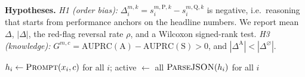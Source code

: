 \documentclass[9pt,twocolumn,letterpaper]{extarticle}
\begin{document}
\textbf{Hypotheses.} \emph{H1 (order bias):} $\Delta_i^{m,k}=s_i^{m,\mathrm{P},k}-s_i^{m,\mathrm{Q},k}$ is negative, i.e.\ reasoning that starts from performance anchors on the headline numbers. We report mean $\Delta$, $|\Delta|$, the red-flag reversal rate $\rho$, and a Wilcoxon signed-rank test. \emph{H3 (knowledge):} $G^{m,c}=\mathrm{AUPRC}(\mathrm{A})-\mathrm{AUPRC}(\mathrm{S})>0$, and $|\Delta^{\mathrm{A}}|<|\Delta^{\varnothing}|$.

\begin{algorithm}[h]
\caption{Order-controlled search agent (batched)}
$h_i\leftarrow\textsc{Prompt}(x_i,c)$ for all $i$; active $\leftarrow$ all\;
\Return $\textsc{ParseJSON}(h_i)$ for all $i$\;
\end{algorithm}
\end{document}
